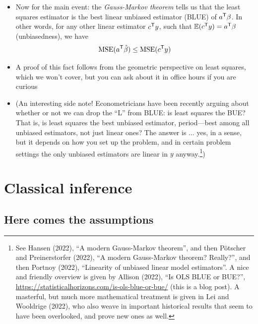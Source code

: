 \documentclass{article}
\begin{document}
\begin{itemize}
\item Now for the main event: the \emph{Gauss-Markov theorem} tells us that
  the least squares estimator is the best linear unbiased estimator (BLUE) of
  $a^{\mathsf{T}} \beta$. In other words, for any other linear estimator $c^{\mathsf{T}} y$, such
  that $\mathbb{E}(c^{\mathsf{T}} y) = a^{\mathsf{T}} \beta$ (unbiasedness), we have  
  \[
  \mathrm{MSE}(a^{\mathsf{T}} \hat{\beta}) \leq \mathrm{MSE}(c^{\mathsf{T}} y)
  \]

\item A proof of this fact follows from the geometric perspective on least
  squares, which we won't cover, but you can ask about it in office hours if you
  are curious  

\item (An interesting side note! Econometricians have been recently arguing about 
  whether or not we can drop the ``L'' from BLUE: is least squares the BUE? That
  is, is least squares the best unbiased estimator, period---best among all
  unbiased estimators, not just linear ones? The answer is ... yes, in a sense,
  but it depends on how you set up the problem, and in certain problem settings
  the only unbiased estimators are linear in $y$ anyway.\footnote{See Hansen
    (2022), ``A modern Gauss-Markov theorem'', and then P{\"o}tscher and
    Preinerstorfer (2022), ``A modern Gauss-Markov theorem? Really?'', and
    then Portnoy (2022), ``Linearity  of unbiased linear model estimators''. A
    nice and friendly overview is given by Allison (2022), ``Is OLS BLUE or
    BUE?'', \url{https://statisticalhorizons.com/is-ols-blue-or-bue/} (this is a
    blog post). A masterful, but much more mathematical treatment is given in
    Lei and Wooldrige (2022), who also weave in important historical results
    that seem to have been overlooked, and prove new ones as well.}) 
\end{itemize}

\section{Classical inference}

\subsection{Here comes the assumptions}

\def\iidsim{\overset{\text{iid}}{\sim}}
\end{document}
